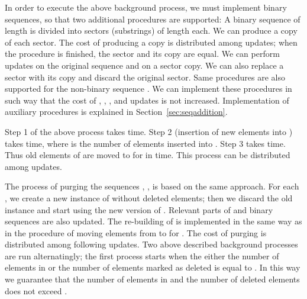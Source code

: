 \documentclass[11pt]{article}\usepackage{fullpage}
\newcommand{\shlongver}[2]{#2}
\begin{document}
In order to execute the above background process, we must implement binary sequences, so that two additional procedures are supported: A binary sequence of length  is divided into  sectors (substrings) of length  each. We can produce a copy of each sector. The cost of producing a copy is distributed among  updates; when the procedure is finished, the sector and its copy are equal. We can perform updates on the original sequence and on a sector copy. We can also replace a sector with its copy and discard the original sector. 
Same procedures are also supported for the non-binary sequence .
We can implement these procedures in such way that the cost of , , , and updates is not increased. Implementation of auxiliary procedures is explained in \shlongver{the full version of this paper, attached at the end of this submission}{Section~\ref{sec:seqaddition}}.

Step 1 of the above process takes  time. Step 2 (insertion of new elements into ) takes  time, where  is the number of elements inserted into . Step 3 takes  time. Thus old elements of  are moved to  for  in 
 time. This process can be distributed among  updates.   


The process of purging the sequences , ,  is based on the same approach. 
For each , we create a new instance of  without  deleted elements; then we discard the old instance 
and start using the new version of . Relevant parts of  and binary sequences are also updated.
The re-building of  is implemented in the same way as in the procedure of moving elements from  to  for .  The cost of purging  is distributed among  following updates. 
Two above described background processes are run alternatingly; the first process starts when the either the number of elements in   or the number of elements marked as deleted is equal to .  In this way we guarantee that the number of elements in  and the number of deleted elements does not exceed .
\end{document}
